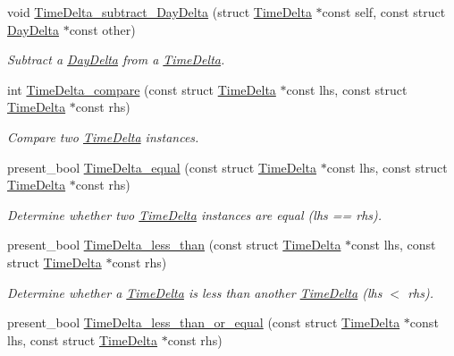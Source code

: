 \begin{DoxyCompactItemize}
void \hyperlink{time-delta_8h_a4c1cce3fe60da8412454e06e9b4a8a1d}{\-Time\-Delta\-\_\-subtract\-\_\-\-Day\-Delta} (struct \hyperlink{structTimeDelta}{\-Time\-Delta} $\ast$const self, const struct \hyperlink{structDayDelta}{\-Day\-Delta} $\ast$const other)
\begin{DoxyCompactList}\small\item\em \-Subtract a \hyperlink{structDayDelta}{\-Day\-Delta} from a \hyperlink{structTimeDelta}{\-Time\-Delta}. \end{DoxyCompactList}\item 
int \hyperlink{time-delta_8h_a1864d69bcd1b4cf445555bc72c21a653}{\-Time\-Delta\-\_\-compare} (const struct \hyperlink{structTimeDelta}{\-Time\-Delta} $\ast$const lhs, const struct \hyperlink{structTimeDelta}{\-Time\-Delta} $\ast$const rhs)
\begin{DoxyCompactList}\small\item\em \-Compare two \hyperlink{structTimeDelta}{\-Time\-Delta} instances. \end{DoxyCompactList}\item 
present\-\_\-bool \hyperlink{time-delta_8h_a99614ad03a84af18cd60d8b25d5c4cee}{\-Time\-Delta\-\_\-equal} (const struct \hyperlink{structTimeDelta}{\-Time\-Delta} $\ast$const lhs, const struct \hyperlink{structTimeDelta}{\-Time\-Delta} $\ast$const rhs)
\begin{DoxyCompactList}\small\item\em \-Determine whether two \hyperlink{structTimeDelta}{\-Time\-Delta} instances are equal (lhs == rhs). \end{DoxyCompactList}\item 
present\-\_\-bool \hyperlink{time-delta_8h_a17c72c9312884c0aabbfbcc6c195fa5e}{\-Time\-Delta\-\_\-less\-\_\-than} (const struct \hyperlink{structTimeDelta}{\-Time\-Delta} $\ast$const lhs, const struct \hyperlink{structTimeDelta}{\-Time\-Delta} $\ast$const rhs)
\begin{DoxyCompactList}\small\item\em \-Determine whether a \hyperlink{structTimeDelta}{\-Time\-Delta} is less than another \hyperlink{structTimeDelta}{\-Time\-Delta} (lhs $<$ rhs). \end{DoxyCompactList}\item 
present\-\_\-bool \hyperlink{time-delta_8h_a719a2e8e64a3f680cff26b4d871a61d3}{\-Time\-Delta\-\_\-less\-\_\-than\-\_\-or\-\_\-equal} (const struct \hyperlink{structTimeDelta}{\-Time\-Delta} $\ast$const lhs, const struct \hyperlink{structTimeDelta}{\-Time\-Delta} $\ast$const rhs)

\end{DoxyCompactItemize}
